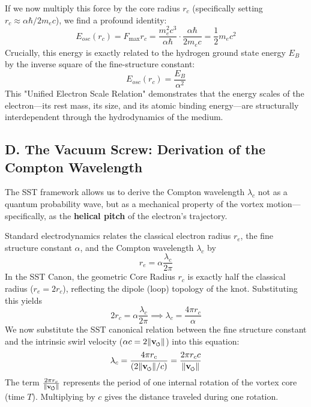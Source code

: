 \documentclass[11pt]{article}
\newcommand{\vswirl}{\mathbf{v}_{\mkern-2mu\scriptscriptstyle\boldsymbol{\circlearrowleft}}}
\begin{document}
If we now multiply this force by the core radius $r_c$ (specifically setting $r_c \approx \alpha \hbar / 2 m_e c$), we find a profound identity:
\begin{equation}
E_{osc}(r_c) = F_{\max} r_c = \frac{m_e^2 c^3}{\alpha \hbar} \cdot \frac{\alpha \hbar}{2 m_e c} = \frac{1}{2} m_e c^2
\end{equation}
Crucially, this energy is exactly related to the hydrogen ground state energy $E_B$ by the inverse square of the fine-structure constant:
\begin{equation}
E_{osc}(r_c) = \frac{E_B}{\alpha^2}
\end{equation}
This "Unified Electron Scale Relation" demonstrates that the energy scales of the electron—its rest mass, its size, and its atomic binding energy—are structurally interdependent through the hydrodynamics of the medium.

\subsection*{D. The Vacuum Screw: Derivation of the Compton Wavelength}
The SST framework allows us to derive the Compton wavelength $\lambda_c$ not as a quantum probability wave, but as a mechanical property of the vortex motion—specifically, as the \textbf{helical pitch} of the electron's trajectory.

Standard electrodynamics relates the classical electron radius $r_e$, the fine structure constant $\alpha$, and the Compton wavelength $\lambda_c$ by
\begin{equation}
r_e = \alpha \frac{\lambda_c}{2\pi}
\end{equation}
In the SST Canon, the geometric Core Radius $r_c$ is exactly half the classical radius ($r_e = 2r_c$), reflecting the dipole (loop) topology of the knot. Substituting this yields
\begin{equation}
2r_c = \alpha \frac{\lambda_c}{2\pi} \implies \lambda_c = \frac{4\pi r_c}{\alpha}
\end{equation}
We now substitute the SST canonical relation between the fine structure constant and the intrinsic swirl velocity ($\alpha c = 2 \|\vswirl\|$) into this equation:
\begin{equation}
\lambda_c = \frac{ 4\pi r_c }{ (2 \|\vswirl\| / c)} = \frac{ 2 \pi r_c c} { \| \vswirl \| }
\end{equation}
The term $\frac{2\pi r_c}{\|\vswirl\|}$ represents the period of one internal rotation of the vortex core (time $T$). Multiplying by $c$ gives the distance traveled during one rotation.
\end{document}
